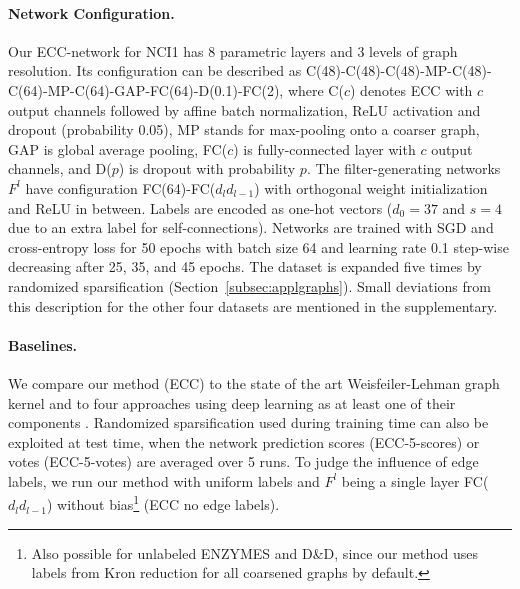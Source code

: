 \documentclass[10pt,twocolumn,letterpaper]{article}
\begin{document}
\paragraph*{Network Configuration.}
Our ECC-network for NCI1 has 8 parametric layers and 3 levels of graph resolution. Its configuration can be described as C(48)-C(48)-C(48)-MP-C(48)-C(64)-MP-C(64)-GAP-FC(64)-D(0.1)-FC(2), where C($c$) denotes ECC with $c$ output channels followed by affine batch normalization, ReLU activation and dropout (probability 0.05), MP stands for max-pooling onto a coarser graph, GAP is global average pooling, FC($c$) is fully-connected layer with $c$ output channels, and D($p$) is dropout with probability $p$. The filter-generating networks $F^l$ have configuration FC(64)-FC($d_l d_{l-1}$) with orthogonal weight initialization~\cite{orthoinit} and ReLU in between. Labels are encoded as one-hot vectors ($d_0=37$ and $s=4$ due to an extra label for self-connections). Networks are trained with SGD and cross-entropy loss for 50 epochs with batch size 64 and learning rate 0.1 step-wise decreasing after 25, 35, and 45 epochs. The dataset is expanded five times by randomized sparsification (Section~\ref{subsec:applgraphs}). Small deviations from this description for the other four datasets are mentioned in the supplementary.

\paragraph*{Baselines.}
We compare our method (ECC) to the state of the art Weisfeiler-Lehman graph kernel \etal \cite{shervashidze} and to four approaches using deep learning as at least one of their components \cite{dcnn, niepert, deepkern, struct2vec}. Randomized sparsification used during training time can also be exploited at test time, when the network prediction scores (ECC-5-scores) or votes (ECC-5-votes) are averaged over 5 runs. To judge the influence of edge labels, we run our method with uniform labels and $F^l$ being a single layer FC($d_l d_{l-1}$) without bias\footnote{Also possible for unlabeled ENZYMES and D{\&}D, since our method uses labels from Kron reduction for all coarsened graphs by default.} (ECC no edge labels). 
\end{document}
